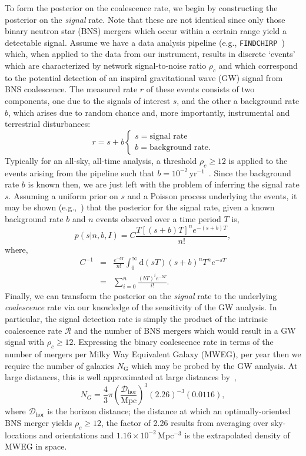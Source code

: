 \documentclass[twocolumn,nofootinbib]{revtex4-1}
\newcommand{\cbcrate}{{{\mathcal R}}}
\newcommand{\diff}{{\mathrm d}}
\newcommand{\dhor}{{\mathcal D}_{\mathrm{hor}}}
\def\bns#1{binary neutron star#1 (BNS#1)\gdef\bns{BNS}}
\def\gw#1{gravitational wave#1 (GW#1)\gdef\gw{GW}}
\def\mweg#1{Milky Way Equivalent Galaxy#1 (MWEG#1)\gdef\mweg{MWEG}}
\begin{document}
To form the posterior on the coalescence rate, we begin by constructing the
posterior on the \emph{signal} rate.  Note that these are not identical since
only those \bns{} mergers which occur within a certain range yield a detectable
signal.  Assume we have a data analysis pipeline (e.g.,
{\tt FINDCHIRP}~\cite{2012PhRvD..85l2006A}) which, when applied to the data from
our instrument, results in discrete `events' which are characterized by network
signal-to-noise ratio $\rho_c$ and which correspond to the potential
detection of an inspiral \gw{} signal from \bns{} coalescence.  The measured
rate $r$ of these events consists of two components, one due to the signals of
interest $s$, and the other a background rate $b$, which arises due to random
chance and, more importantly, instrumental and terrestrial disturbances:
%
\begin{equation}
r = s + b
\begin{cases}
s = \text{signal rate} \\
b = \text{background rate}.
\end{cases}
\end{equation}
%
Typically for an all-sky, all-time analysis, a threshold $\rho_c\geq 12$ is
applied to the events arising from the pipeline such that
$b=10^{-2}$\,yr$^{-1}$~\cite{ade_prospects}.  Since the background rate $b$ is
known then, we are just left with the problem of inferring the signal rate $s$.
Assuming a uniform prior on $s$ and a Poisson process underlying the events, it
may be shown (e.g.,~\cite{2010blda.book.....G}) that the posterior for the
signal rate, given a known background rate $b$ and $n$ events observed over a
time period $T$ is,
%
\begin{equation}
p(s|n,b,I) = C \frac{ T\left[(s+b)T\right]^n e^{-(s+b)T}}{n!},
\end{equation}
%
where,
\begin{eqnarray}
C^{-1} & = &\frac{e^{-bT}}{n!} \int_0^{\infty}\diff(sT)(s+b)^n T^n e^{-sT}\\
& = & \sum_{i=0}^n \frac{ (bT)^i e^{-bT}}{i!}.
\end{eqnarray}
%
Finally, we can transform the posterior on the \emph{signal} rate to the
underlying \emph{coalescence} rate via our knowledge of the sensitivity of the
\gw{} analysis.  In particular,  the signal detection rate is simply the product
of the intrinsic coalescence rate $\cbcrate$ and the number of \bns{} mergers
which would result in a \gw{} signal with $\rho_c\geq12$.   Expressing the
binary coalescence rate in terms of the number of mergers per \mweg{}, per year
then we require the number of galaxies $N_{\mathrm{G}}$ which may be probed by
the \gw{} analysis.  At large distances, this is well approximated at large
distances by~\cite{rates_paper},
%
\begin{equation}
    N_G = \frac{4}{3} \pi \left( \frac{\dhor}{\textrm{Mpc}}
\right)^3 (2.26)^{-3} (0.0116),
\end{equation}
%
where $\dhor$ is the horizon distance; the distance at which an
optimally-oriented \bns{} merger yields $\rho_c\geq12$, the factor of 2.26
results from averaging over sky-locations and orientations and $1.16\times
10^{-2}$\,Mpc$^{-3}$ is the extrapolated density of \mweg{} in space.
\end{document}
